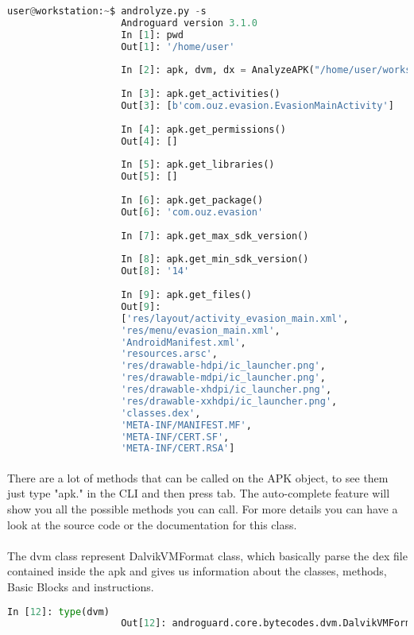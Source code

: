 \documentclass[../main.tex]{subfile}
\begin{document}
		
				\begin{lstlisting}[language=python]
					user@workstation:~$ androlyze.py -s
					Androguard version 3.1.0
					In [1]: pwd
					Out[1]: '/home/user'
					
					In [2]: apk, dvm, dx = AnalyzeAPK("/home/user/workspace/apps/evasion.apk")
					
					In [3]: apk.get_activities()
					Out[3]: [b'com.ouz.evasion.EvasionMainActivity']
					
					In [4]: apk.get_permissions()
					Out[4]: []
					
					In [5]: apk.get_libraries()
					Out[5]: []
					
					In [6]: apk.get_package()
					Out[6]: 'com.ouz.evasion'
					
					In [7]: apk.get_max_sdk_version()
					
					In [8]: apk.get_min_sdk_version()
					Out[8]: '14'
					
					In [9]: apk.get_files()
					Out[9]: 
					['res/layout/activity_evasion_main.xml',
					'res/menu/evasion_main.xml',
					'AndroidManifest.xml',
					'resources.arsc',
					'res/drawable-hdpi/ic_launcher.png',
					'res/drawable-mdpi/ic_launcher.png',
					'res/drawable-xhdpi/ic_launcher.png',
					'res/drawable-xxhdpi/ic_launcher.png',
					'classes.dex',
					'META-INF/MANIFEST.MF',
					'META-INF/CERT.SF',
					'META-INF/CERT.RSA']
				\end{lstlisting}
			\paragraph{} There are a lot of methods that can be called on the APK object, to see them just type "apk." in the CLI and then press tab. The auto-complete feature will show you all the possible methods you can call. For more details you can have a look at the source code or the documentation for this class.
			
			\paragraph{} The dvm class represent DalvikVMFormat class, which basically parse the dex file contained inside the apk and gives us information about the classes, methods, Basic Blocks and instructions.
				\begin{lstlisting}[language=python]
					In [12]: type(dvm)
					Out[12]: androguard.core.bytecodes.dvm.DalvikVMFormat
				\end{lstlisting}
\end{document}
